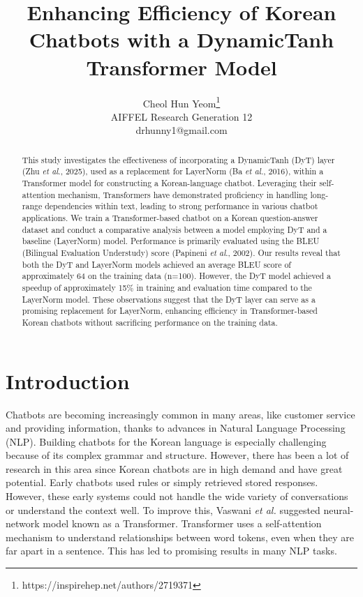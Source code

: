 \documentclass{article}
\title{Enhancing Efficiency of Korean Chatbots with a DynamicTanh Transformer Model}
\author{
  Cheol Hun Yeom\thanks{https://inspirehep.net/authors/2719371} \\
  AIFFEL Research Generation 12\\
  drhunny1@gmail.com\\
}
\begin{document}
\maketitle


\begin{abstract}
This study investigates the effectiveness of incorporating a DynamicTanh (DyT) layer (Zhu \textit{et al}., 2025), used as a replacement for LayerNorm (Ba \textit{et al}., 2016), within a Transformer model for constructing a Korean-language chatbot. Leveraging their self-attention mechanism, Transformers have demonstrated proficiency in handling long-range dependencies within text, leading to strong performance in various chatbot applications. We train a Transformer-based chatbot on a Korean question-answer dataset and conduct a comparative analysis between a model employing DyT and a baseline (LayerNorm) model. Performance is primarily evaluated using the BLEU (Bilingual Evaluation Understudy) score (Papineni \textit{et al}., 2002). Our results reveal that both the DyT and LayerNorm models achieved an average BLEU score of approximately 64 on the training data (n=100). However, the DyT model achieved a speedup of approximately 15\% in training and evaluation time compared to the LayerNorm model. These observations suggest that the DyT layer can serve as a promising replacement for LayerNorm, enhancing efficiency in Transformer-based Korean chatbots without sacrificing performance on the training data.
\end{abstract}


\section{Introduction}

Chatbots are becoming increasingly common in many areas, like customer service and providing information, thanks to advances in Natural Language Processing (NLP). Building chatbots for the Korean language is especially challenging because of its complex grammar and structure. However, there has been a lot of research in this area since Korean chatbots are in high demand and have great potential. Early chatbots used rules or simply retrieved stored responses. \cite{weizenbaum1966eliza} However, these early systems could not handle the wide variety of conversations or understand the context well. To improve this, Vaswani \textit{et al.} suggested neural-network model known as a Transformer. \cite{vaswani2017attention} Transformer uses a self-attention mechanism to understand relationships between word tokens, even when they are far apart in a sentence. This has led to promising results in many NLP tasks.
\end{document}
